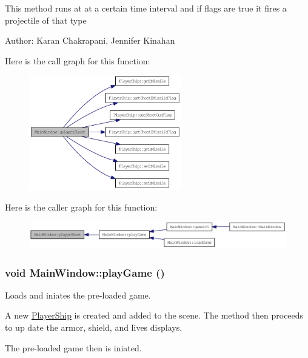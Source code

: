 This method runs at at a certain time interval and if flags are true it fires a projectile of that type

Author: Karan Chakrapani, Jennifer Kinahan 

Here is the call graph for this function:\nopagebreak
\begin{figure}[H]
\begin{center}
\leavevmode
\includegraphics[width=188pt]{class_main_window_a82a6ee47ad6e73ab2eb6816ee6324708_cgraph}
\end{center}
\end{figure}


Here is the caller graph for this function:\nopagebreak
\begin{figure}[H]
\begin{center}
\leavevmode
\includegraphics[width=330pt]{class_main_window_a82a6ee47ad6e73ab2eb6816ee6324708_icgraph}
\end{center}
\end{figure}
\hypertarget{class_main_window_a400071005bde6fee0623aafdb071ba89}{
\subsubsection[{playGame}]{\setlength{\rightskip}{0pt plus 5cm}void MainWindow::playGame ()}}
\label{class_main_window_a400071005bde6fee0623aafdb071ba89}
Loads and iniates the pre-\/loaded game.

A new \hyperlink{class_player_ship}{PlayerShip} is created and added to the scene. The method then proceeds to up date the armor, shield, and lives displays. \par
 The pre-\/loaded game then is iniated.

